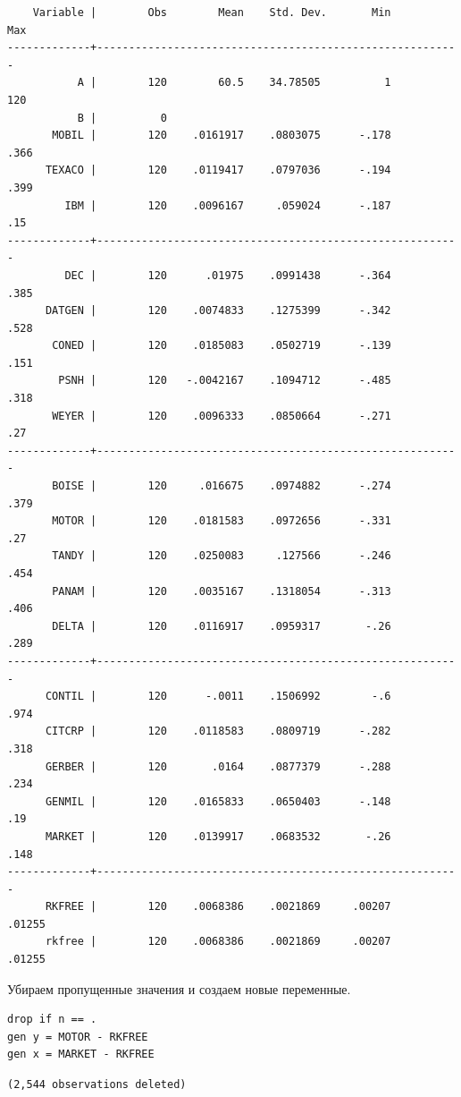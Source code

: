 \documentclass[]{book}
\begin{document}
\begin{verbatim}
    Variable |        Obs        Mean    Std. Dev.       Min        Max
-------------+---------------------------------------------------------
           A |        120        60.5    34.78505          1        120
           B |          0
       MOBIL |        120    .0161917    .0803075      -.178       .366
      TEXACO |        120    .0119417    .0797036      -.194       .399
         IBM |        120    .0096167     .059024      -.187        .15
-------------+---------------------------------------------------------
         DEC |        120      .01975    .0991438      -.364       .385
      DATGEN |        120    .0074833    .1275399      -.342       .528
       CONED |        120    .0185083    .0502719      -.139       .151
        PSNH |        120   -.0042167    .1094712      -.485       .318
       WEYER |        120    .0096333    .0850664      -.271        .27
-------------+---------------------------------------------------------
       BOISE |        120     .016675    .0974882      -.274       .379
       MOTOR |        120    .0181583    .0972656      -.331        .27
       TANDY |        120    .0250083     .127566      -.246       .454
       PANAM |        120    .0035167    .1318054      -.313       .406
       DELTA |        120    .0116917    .0959317       -.26       .289
-------------+---------------------------------------------------------
      CONTIL |        120      -.0011    .1506992        -.6       .974
      CITCRP |        120    .0118583    .0809719      -.282       .318
      GERBER |        120       .0164    .0877379      -.288       .234
      GENMIL |        120    .0165833    .0650403      -.148        .19
      MARKET |        120    .0139917    .0683532       -.26       .148
-------------+---------------------------------------------------------
      RKFREE |        120    .0068386    .0021869     .00207     .01255
      rkfree |        120    .0068386    .0021869     .00207     .01255
\end{verbatim}

Убираем пропущенные значения и создаем новые переменные.

\begin{verbatim}
drop if n == .
gen y = MOTOR - RKFREE
gen x = MARKET - RKFREE
\end{verbatim}

\begin{verbatim}
(2,544 observations deleted)
\end{verbatim}
\end{document}
